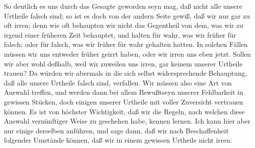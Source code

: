 So deutlich es uns durch das Gesagte geworden seyn mag, daß nicht alle unsere Urtheile falsch sind; so ist es doch von der andern Seite gewiß, daß wir nur gar zu oft irren; denn wie oft behaupten wir nicht das Gegentheil von dem, was wir zu irgend einer früheren Zeit behauptet, und halten für wahr, was wir früher für falsch; oder für falsch, was wir früher für wahr gehalten hatten. In solchen Fällen müssen wir uns entweder früher geirrt haben, oder wir irren uns eben jetzt. Sollen wir aber wohl deßhalb, weil wir zuweilen uns irren, gar keinem unserer Urtheile trauen? Da würden wir abermals in die sich selbst widersprechende Behauptung, daß alle unsere Urtheile falsch sind, verfallen. Wir müssen also eine Art von Auswahl treffen, und werden dann bei allem Bewußtseyn unserer Fehlbarkeit in gewissen Stücken, doch einigen unserer Urtheile mit voller Zuversicht vertrauen können. Es ist von höchster Wichtigkeit, daß wir die Regeln, nach welchen diese Auswahl vernünftiger Weise zu geschehen habe, kennen lernen. Ich kann hier aber nur einige derselben anführen, und sage dann, daß wir nach Beschaffenheit folgender Umstände  können, daß wir in einem gewissen Urtheile nicht irren:~
